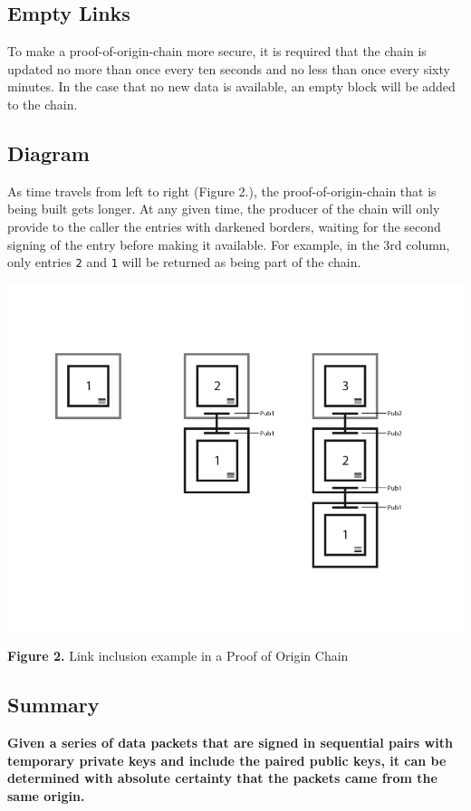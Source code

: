 \documentclass{article}
\begin{document}
\subsection {Empty Links}
To make a \Gls{proof-of-origin-chain} more secure, it is required that the chain is updated no more than once every ten seconds and no less than once every sixty minutes. In the case that no new data is available, an empty block will be added to the chain.

\subsection {Diagram}
As time travels from left to right (Figure 2.), the \Gls{proof-of-origin-chain} that is being built gets longer. At any given time, the producer of the chain will only provide to the caller the entries with darkened borders, waiting for the second signing of the entry before making it available. For example, in the 3rd column, only entries \texttt{2} and \texttt{1} will be returned as being part of the chain.

\includegraphics[width=\textwidth] {proofoforigin}
\begin{center}\textbf{Figure 2.}  Link inclusion example in a Proof of Origin Chain
\end{center}

\subsection {Summary}
\textbf{Given a series of data packets that are signed in sequential pairs with temporary private keys and include the paired public keys, it can be determined with absolute \gls{certainty} that the packets came from the same origin.}
\end{document}
